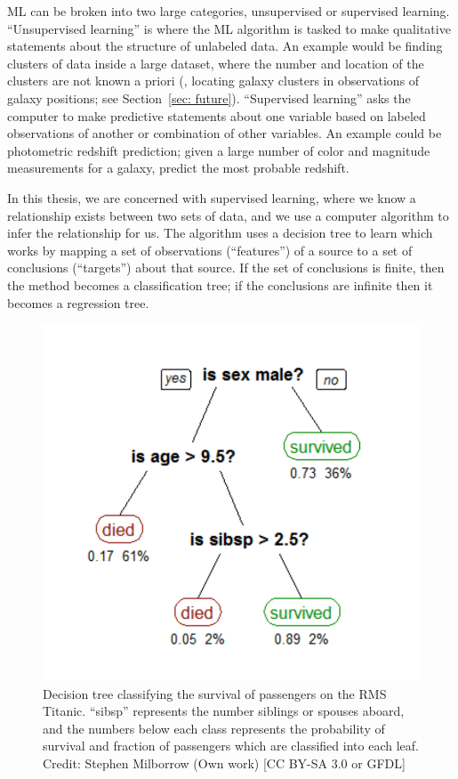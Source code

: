 ML can be broken into two large categories, unsupervised or supervised learning. ``Unsupervised learning'' is where the ML algorithm is tasked to make qualitative statements about the structure of unlabeled data. An example would be finding clusters of data inside a large dataset, where the number and location of the clusters are not known a priori (\eg, locating galaxy clusters in observations of galaxy positions; see Section~\ref{sec: future}). ``Supervised learning''  asks the computer to make predictive statements about one variable based on labeled observations of another or combination of other variables. An example could be photometric redshift prediction; given a large number of color and magnitude measurements for a galaxy, predict the most probable redshift.  

In this thesis, we are concerned with supervised learning, where we know a relationship exists between two sets of data, and we use a computer algorithm to infer the relationship for us. The algorithm uses a decision tree to learn which works by mapping a set of observations (``features'') of a source to a set of conclusions (``targets'') about that source. If the set of conclusions is finite, then the method becomes a classification tree; if the conclusions are infinite then it becomes a regression tree. 

\begin{figure}[!ht]
	\begin{center}
		\includegraphics[height=0.5\textheight]{figures/CART_tree_titanic_survivors.pdf} 
	\end{center}
	\caption[An example of a classification tree.]{Decision tree classifying the survival of passengers on the RMS Titanic. ``sibsp'' represents the number siblings or spouses aboard, and the numbers below each class represents the probability of survival and fraction of passengers which are classified into each leaf. Credit: Stephen Milborrow (Own work) [CC BY-SA 3.0 or GFDL]}
	\label{fig: cart tree} 
\end{figure}

